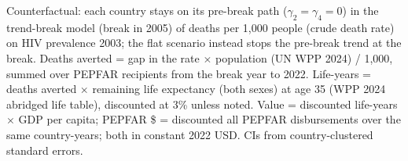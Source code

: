 \begin{table}[htbp]
\begin{minipage}{\textwidth}\footnotesize Counterfactual: each country stays on its pre-break path ($\gamma_2 = \gamma_4 = 0$) in the trend-break model (break in 2005) of deaths per 1,000 people (crude death rate) on HIV prevalence 2003; the flat scenario instead stops the pre-break trend at the break. Deaths averted = gap in the rate $\times$ population (UN WPP 2024) / 1,000, summed over PEPFAR recipients from the break year to 2022. Life-years = deaths averted $\times$ remaining life expectancy (both sexes) at age 35 (WPP 2024 abridged life table), discounted at 3\% unless noted. Value = discounted life-years $\times$ GDP per capita; PEPFAR \$ = discounted all PEPFAR disbursements over the same country-years; both in constant 2022 USD. CIs from country-clustered standard errors.\end{minipage}
\end{table}
